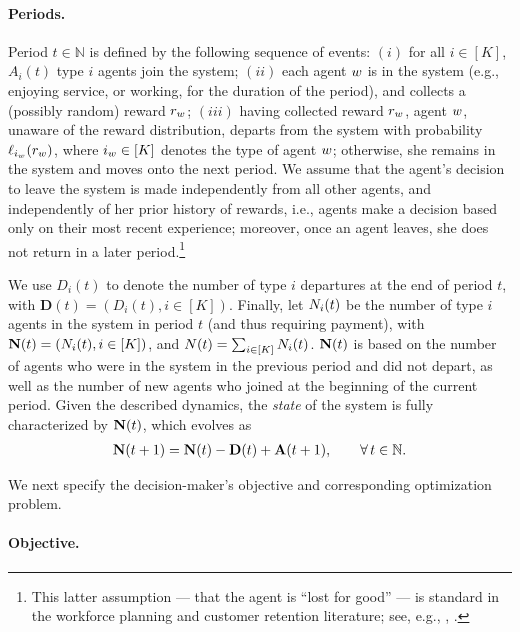 \documentclass[12pt]{article}
\begin{document}
\paragraph{Periods.} Period $t \in \mathbb{N}$ is defined by the following sequence of events: $(i)$ for all $i \in [K]$, $A_i(t)$ type $i$ agents join the system; $(ii)$ each agent $w$ is in the system (e.g., enjoying service, or working, for the duration of the period), and collects a (possibly random) reward $r_{w}$; $(iii)$ having collected reward $r_{w}$, {agent $w$, unaware of the reward distribution, departs from the system with probability $\ell_{i_w}(r_{w})$, where $i_w \in [K]$ denotes the type of agent $w$;
otherwise, she remains in the system and moves onto the next period. We assume that the agent's decision to leave the system is made independently from all other agents, and independently of her prior history of rewards, i.e., agents make a decision based only on {their most recent experience}; moreover}, once an agent leaves, she does not return in a later period.\footnote{This latter assumption --- that the agent is ``lost for good'' --- is standard in the workforce planning and customer retention literature; see, e.g., \cite{aflaki2014managing}, \cite{arlotto2014optimal}.}


We use $D_i(t)$ to denote the number of type $i$ departures at the end of period $t$, with $\mathbf{D}(t) = \left(D_i(t), i \in [K]\right)$. Finally, let ${N}_i(t)$ be the number of type $i$ agents in the system in period $t$ (and thus requiring payment), with ${\mathbf{N}}(t) = \left({N}_i(t), i \in [K]\right)$, and ${N}(t) = \sum_{i \in [K]} {N}_i(t)$. ${\mathbf{N}}(t)$ {is based on the number of agents who were in the system in the previous period and did not depart, as well as the number of new agents who joined {at the beginning of the} current period. Given the described dynamics, the {\it state} of the system is fully characterized by} ${\mathbf{N}}(t)$, which evolves as
\begin{align*}
{\mathbf{N}}(t+1) = {\mathbf{N}}(t) - \mathbf{D}(t) + \mathbf{A}(t+1), \qquad \forall \, t \in \mathbb{N}.
\end{align*}



We next specify the decision-maker's objective and corresponding optimization problem.

\paragraph{Objective.}
\end{document}
